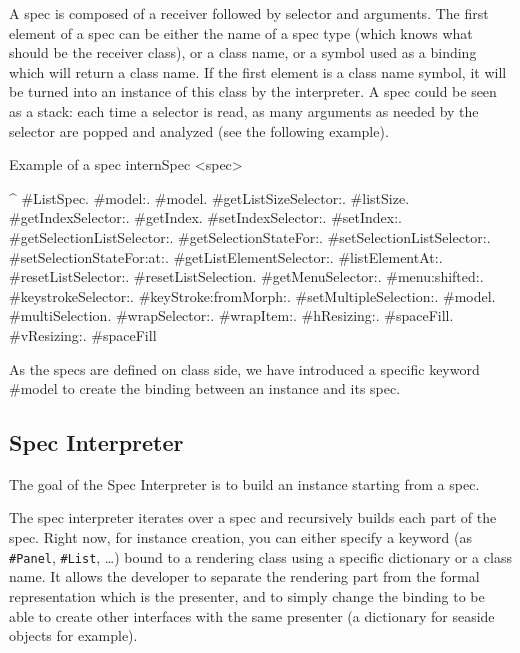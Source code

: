 \documentclass[a4paper,10pt,twoside]{book}
\begin{document}
A spec is composed of a receiver followed by selector and arguments.
The first element of a spec can be either the name of a spec type (which knows what should be the receiver class), or a class name, or a symbol used as a binding which will return a class name. If the first element is a class name symbol, it will be turned into an instance of this class by the interpreter. A spec could be seen as a stack: each time a selector is read, as many arguments as needed by the selector are popped and analyzed (see the following example).

\begin{method}{Example of a spec}
internSpec
	<spec>
	
	^ {#ListSpec.	
               #model:.                                        #model.
               #getListSizeSelector:.                   #listSize.
               #getIndexSelector:.                       #getIndex.
               #setIndexSelector:.                       #setIndex:.
               #getSelectionListSelector:.	         #getSelectionStateFor:.
               #setSelectionListSelector:.	         #setSelectionStateFor:at:.
               #getListElementSelector:. 	        #listElementAt:.
               #resetListSelector:.                       #resetListSelection.
               #getMenuSelector:.	                   #menu:shifted:.
               #keystrokeSelector:.                     #keyStroke:fromMorph:.
               #setMultipleSelection:.	               {#model. #multiSelection}.
               #wrapSelector:.                            #wrapItem:.
               #hResizing:.                                 #spaceFill.
               #vResizing:.                                 #spaceFill}
\end{method} 

As the specs are defined on class side, we have introduced a specific keyword \#model to create the binding between an instance and its spec.

\subsection{Spec Interpreter}

The goal of the Spec Interpreter is to build an instance starting from a spec.

The spec interpreter iterates over a spec and recursively builds each part of the spec. Right now, for instance creation, you can either specify a keyword (as \verb+#Panel+, \verb+#List+, \dots) bound to a rendering class using a specific dictionary or a class name. It allows the developer to separate the rendering part from the formal representation which is the presenter, and to simply change the binding to be able to create other interfaces with the same presenter (a dictionary for seaside objects for example).
\end{document}

